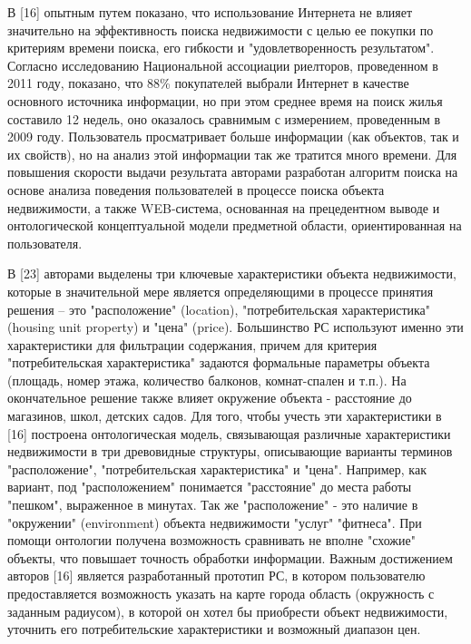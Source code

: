 \documentclass[a4paper,14pt,openany,final]{extreport} %
\begin{document}
В [16] опытным путем показано, что использование Интернета не влияет значительно на эффективность поиска недвижимости с целью ее покупки по критериям времени поиска, его гибкости и "удовлетворенность результатом". Согласно исследованию Национальной ассоциации риелторов, проведенном в 2011 году, показано, что 88\% покупателей выбрали Интернет в качестве основного источника информации, но при этом среднее время на поиск жилья составило 12 недель, оно оказалось сравнимым с измерением, проведенным в 2009 году. Пользователь просматривает больше информации (как объектов, так и их свойств), но на анализ этой информации так же тратится много времени. Для повышения скорости выдачи результата авторами разработан алгоритм поиска на основе анализа поведения пользователей в процессе поиска объекта недвижимости, а также WEB-система, основанная на прецедентном выводе и онтологической концептуальной модели предметной области, ориентированная на пользователя.

В [23] авторами выделены три ключевые характеристики объекта недвижимости, которые в значительной мере является определяющими в процессе принятия решения – это "расположение" (location), "потребительская характеристика" (housing unit property) и "цена" (price). Большинство РС используют именно эти характеристики для фильтрации содержания, причем для критерия "потребительская характеристика" задаются формальные параметры объекта (площадь, номер этажа, количество балконов, комнат-спален и т.п.). На окончательное решение также влияет окружение объекта - расстояние до магазинов, школ, детских садов. Для того, чтобы учесть эти характеристики в [16] построена онтологическая модель, связывающая различные характеристики недвижимости в три древовидные структуры, описывающие варианты терминов "расположение", "потребительская характеристика" и "цена". Например, как вариант, под "расположением" понимается "расстояние" до места работы "пешком", выраженное в минутах. Так же "расположение" - это наличие в "окружении" (environment) объекта недвижимости "услуг" "фитнеса". При помощи онтологии получена возможность сравнивать не вполне "схожие" объекты, что повышает точность обработки информации.
Важным достижением авторов [16] является разработанный прототип РС, в котором пользователю предоставляется возможность указать на карте города область (окружность с заданным радиусом), в которой он хотел бы приобрести объект недвижимости, уточнить его потребительские характеристики и возможный диапазон цен.
\end{document}
